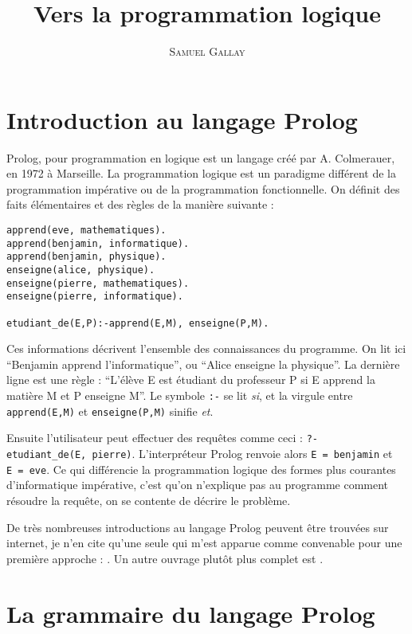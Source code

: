 \documentclass{article}
\title{Vers la programmation logique}
\author{\textsc{Samuel Gallay}}
\begin{document}
\maketitle

\section{Introduction au langage Prolog}

Prolog, pour programmation en logique est un langage créé par A. Colmerauer, en 1972 à Marseille. La programmation logique est un paradigme différent de la programmation impérative ou de la programmation fonctionnelle. On définit des faits élémentaires et des règles de la manière suivante :

\begin{verbatim}
apprend(eve, mathematiques).
apprend(benjamin, informatique).
apprend(benjamin, physique).
enseigne(alice, physique).
enseigne(pierre, mathematiques).
enseigne(pierre, informatique).

etudiant_de(E,P):-apprend(E,M), enseigne(P,M).
\end{verbatim}

Ces informations décrivent l'ensemble des connaissances du programme. On lit ici ``Benjamin apprend l'informatique'', ou ``Alice enseigne la physique''. La dernière ligne est une règle : ``L'élève E est étudiant du professeur P si E apprend la matière M et P enseigne M''. Le symbole \texttt{:-} se lit \emph{si}, et la virgule entre \texttt{apprend(E,M)} et \texttt{enseigne(P,M)} sinifie \emph{et}.

Ensuite l'utilisateur peut effectuer des requêtes comme ceci : \texttt{?-etudiant\_de(E,\ pierre)}. L'interpréteur Prolog renvoie alors \texttt{E\ =\ benjamin} et \texttt{E\ =\ eve}. Ce qui différencie la programmation logique des formes plus courantes d'informatique impérative, c'est qu'on n'explique pas au programme comment résoudre la requête, on se contente de décrire le problème.

De très nombreuses introductions au langage Prolog peuvent être trouvées sur internet, je n'en cite qu'une seule qui m'est apparue comme convenable pour une première approche : \cite{Flach}. Un autre ouvrage plutôt plus complet est \cite{Sterling}.

\section{La grammaire du langage Prolog}
\end{document}
